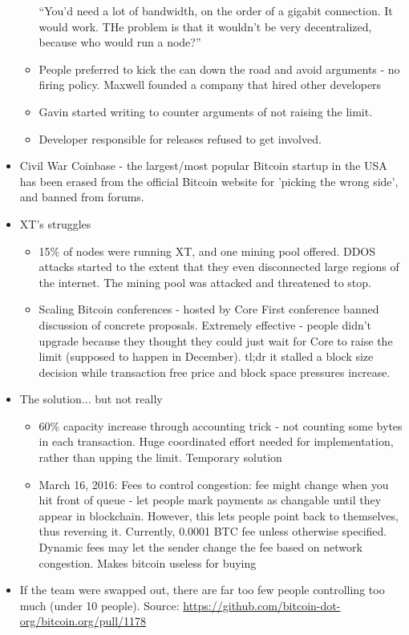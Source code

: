 \documentclass{article}
\begin{document}
\begin{itemize}
\begin{itemize}
        \subitem ``You'd need a lot of bandwidth, on the order of a gigabit connection. It would work. THe problem is that it wouldn't be very decentralized, because
        who would run a node?''
      \item People preferred to kick the can down the road and avoid arguments - no firing policy. Maxwell founded a company that hired other developers
      \item Gavin started writing to counter arguments of not raising the limit.
      \item Developer responsible for releases refused to get involved.
    \end{itemize}
  \item Civil War
    \subitem Coinbase - the largest/most popular Bitcoin startup in the USA has been erased from the official Bitcoin website for
    'picking the wrong side', and banned from forums.
  \item XT's struggles
    \begin{itemize}
      \item 15\% of nodes were running XT, and one mining pool offered. DDOS attacks started to the extent that
        they even disconnected large regions of the internet. The mining pool was attacked and threatened to stop.
      \item Scaling Bitcoin conferences - hosted by Core
        \subitem First conference banned discussion of concrete proposals.
        \subitem Extremely effective - people didn't upgrade because they thought they could just wait for Core to raise the limit (supposed to
        happen in December).
        \subitem tl;dr it stalled a block size decision while transaction free price and block space pressures increase.
    \end{itemize}
  \item The solution... but not really
    \begin{itemize}
      \item 60\% capacity increase through accounting trick - not counting some bytes in each transaction.
        \subitem Huge coordinated effort needed for implementation, rather than upping the limit.
        \subitem Temporary solution
      \item March 16, 2016: Fees to control congestion: fee might change when you hit front of queue - let people mark payments as
        changable until they appear in blockchain. However, this lets people point back to themselves, thus reversing it.
        \subitem Currently, 0.0001 BTC fee unless otherwise specified. Dynamic fees may let the sender change the fee based on network congestion.
        \subitem Makes bitcoin useless for buying
    \end{itemize}
  \item If the team were swapped out, there are far too few people controlling too much (under 10 people).
    Source: \url{https://github.com/bitcoin-dot-org/bitcoin.org/pull/1178}
\end{itemize}
\end{document}
